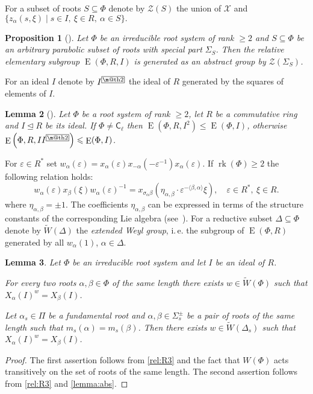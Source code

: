 \documentclass[11pt]{amsart}
\makeatletter
\theoremstyle{plain}
\numberwithin{equation}{section}
\newtheorem{lemma}{Lemma}
\numberwithin{lemma}{section}
\newtheorem{prop}[lemma]{Proposition}
\theoremstyle{definition}
\theoremstyle{remark}
\DeclareMathOperator{\E}{E}
\DeclareMathOperator{\rk}{rk}
\newcommand{\rC}{\mathsf{C}}
\newcommand{\indexbox}[1]{\text{\fboxsep=.1em\fbox{\m@th$\displaystyle#1$}}}
\makeatother
\begin{document}
For a subset of roots $S\subseteq\Phi$ denote by $\mathcal{Z}(S)$ the union of $\mathcal{X}$ and $\{ z_\alpha(s, \xi) \mid s\in I, \ \xi \in R, \ \alpha \in S\}.$
\begin{prop}[{\cite[Theorem~3.4]{S}}] \label{prop:Stepanov-theorem} Let $\Phi$ be an irreducible root system of rank $\geq 2$ and $S \subseteq \Phi$ be an arbitrary parabolic subset of roots with special part $\Sigma_S$.
 Then the relative elementary subgroup $\E(\Phi, R, I)$ is generated as an abstract group by $\mathcal{Z}(\Sigma_S)$. \end{prop}
For an ideal $I$ denote by $I^{\indexbox{2}}$ the ideal of $R$ generated by the squares of elements of $I$.
 \begin{lemma}[{\cite[Corollary~3.3]{S}}]\label{lemma:Stepanov-ideal}
Let $\Phi$ be a root system of rank $\geqslant2$, let $R$ be a commutative ring and $I\trianglelefteq R$ be its ideal.
If $\Phi\neq\rC_\ell$ then $\E\left(\Phi, R, I^2\right)\leqslant\E(\Phi, I)$, otherwise $\E\left(\Phi, R, II^{\indexbox{2}}\right)\leqslant\E(\Phi, I)$.
\end{lemma}
For $\varepsilon\in R^*$ set $w_\alpha(\varepsilon) = x_\alpha(\varepsilon) x_{-\alpha}(-\varepsilon^{-1}) x_{\alpha}(\varepsilon).$
If $\rk(\Phi)\geqslant 2$ the following relation holds:
\begin{equation}\label{rel:R3}
w_\alpha(\varepsilon) x_{\beta}(\xi) w_\alpha(\varepsilon)^{-1} =
x_{\sigma_{\alpha}\beta} \left(\eta_{\alpha, \beta}\cdot\varepsilon^{-\langle\beta, \alpha \rangle}\xi\right), \quad \varepsilon\in R^*, \ \xi\in R.
\end{equation}
where $\eta_{\alpha, \beta}=\pm 1$. The coefficients $\eta_{\alpha, \beta}$ can be expressed in terms of the structure constants of the corresponding Lie algebra (see~\cite[\S13]{VP}).
For a reductive subset $\Delta \subseteq \Phi$ denote by $\widetilde{W}(\Delta)$ the \emph{extended Weyl group}, i.\,e. the subgroup of $\E(\Phi, R)$ generated by all $w_{\alpha}(1)$, $\alpha \in \Delta$.
\begin{lemma} \label{lemma:weylfacts} Let $\Phi$ be an irreducible root system and let $I$ be an ideal of $R$. 
\begin{lemlist}
\item \label{item-trans1} For every two roots $\alpha, \beta \in \Phi$ of the same length there exists $w \in \widetilde{W}(\Phi)$ such that $X_{\alpha}(I)^w = X_\beta(I)$.
\item \label{item-trans2} Let $\alpha_s\in \Pi$ be a fundamental root and $\alpha, \beta \in \Sigma^\pm_s$ be a pair of roots of the same length such that $m_s(\alpha) = m_s(\beta)$.
 Then there exists $w\in \widetilde{W}(\Delta_s)$ such that $X_\alpha(I)^w = X_\beta(I)$. \end{lemlist}
\end{lemma}
\begin{proof}
The first assertion follows from \eqref{rel:R3} and the fact that $W(\Phi)$ acts transitively on the set of roots of the same length.
The second assertion follows from \eqref{rel:R3} and \cref{lemma:abs}.
\end{proof}
\end{document}
